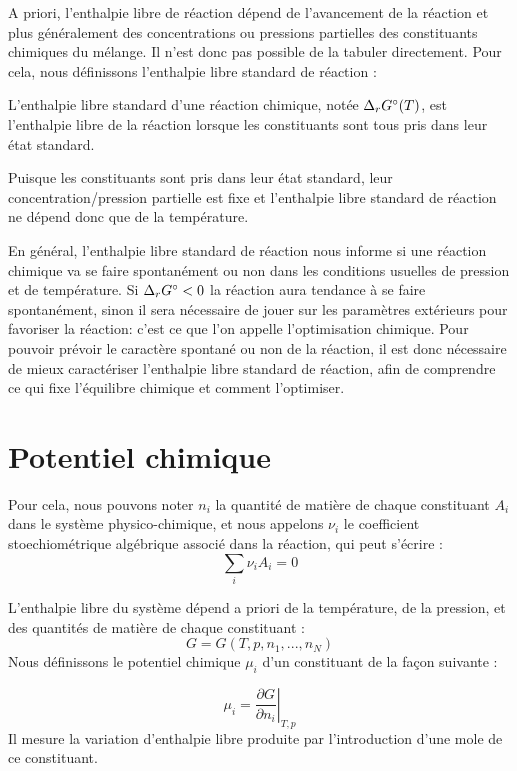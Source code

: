 \documentclass[11pt,fleqn]{book} %
\begin{document}
A priori, l'enthalpie libre de réaction dépend de l'avancement de la réaction et plus généralement des concentrations ou pressions partielles des constituants chimiques du mélange. Il n'est donc pas possible de la tabuler directement. Pour cela, nous définissons l'enthalpie libre standard de réaction :
\begin{definition}
    L'enthalpie libre standard d'une réaction chimique, notée $\Delta_r G\degree(T)$, est l'enthalpie libre de la réaction lorsque les constituants sont tous pris dans leur état standard.
\end{definition}
\begin{remark}
    Puisque les constituants sont pris dans leur état standard, leur concentration/pression partielle est fixe et l'enthalpie libre standard de réaction ne dépend donc que de la température.
\end{remark}

En général, l'enthalpie libre standard de réaction nous informe si une réaction chimique va se faire spontanément ou non dans les conditions usuelles de pression et de température. Si $\Delta_rG\degree<0$ la réaction aura tendance à se faire spontanément, sinon il sera nécessaire de jouer sur les paramètres extérieurs pour favoriser la réaction: c'est ce que l'on appelle l'optimisation chimique. Pour pouvoir prévoir le caractère spontané ou non de la réaction, il est donc nécessaire de mieux caractériser l'enthalpie libre standard de réaction, afin de comprendre ce qui fixe l'équilibre chimique et comment l'optimiser.

\section{Potentiel chimique}

Pour cela, nous pouvons noter $n_i$ la quantité de matière de chaque constituant $A_i$ dans le système physico-chimique, et nous appelons $\nu_i$ le coefficient stoechiométrique algébrique associé dans la réaction, qui peut s'écrire :
\begin{equation}
    \sum_i \nu_i A_i = 0
\end{equation}

L'enthalpie libre du système dépend a priori de la température, de la pression, et des quantités de matière de chaque constituant :
\begin{equation}
    G = G(T,p, n_1, ..., n_N)
\end{equation}
Nous définissons le potentiel chimique $\mu_i$ d'un constituant de la façon suivante :
\begin{definition}
    \begin{equation}
    \mu_i = \left. \frac{\partial G}{\partial n_i} \right|_{T,p}
    \end{equation}
    Il mesure la variation d'enthalpie libre produite par l'introduction d'une mole de ce constituant.
\end{definition}
\end{document}
